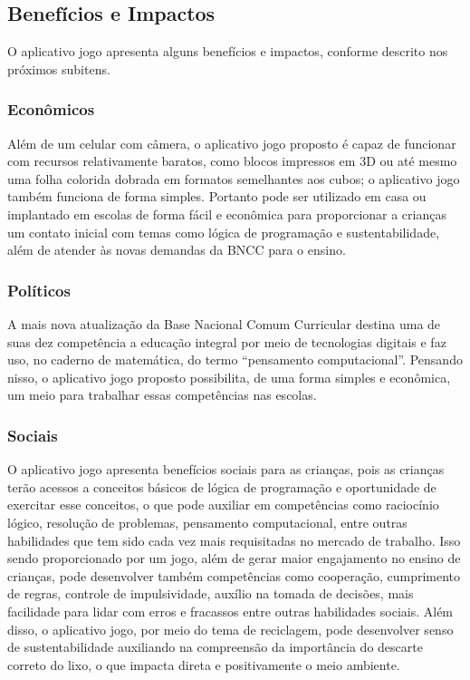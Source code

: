     \subsection{Benefícios e Impactos}
    O aplicativo jogo apresenta alguns benefícios e impactos, conforme descrito nos próximos subitens.

        \subsubsection{Econômicos}
        Além de um celular com câmera, o aplicativo jogo proposto é capaz de funcionar com recursos relativamente baratos, como blocos impressos em 3D ou até mesmo uma folha colorida dobrada em formatos semelhantes aos cubos; o aplicativo jogo também funciona de forma simples. Portanto pode ser utilizado em casa ou implantado em escolas de forma fácil e econômica para proporcionar a crianças um contato inicial com temas como lógica de programação e sustentabilidade, além de atender às novas demandas da BNCC para o ensino.
        
        
        
        \subsubsection{Políticos}
        A mais nova atualização da Base Nacional Comum Curricular destina uma de suas dez competência a educação integral por meio de tecnologias digitais e faz uso, no caderno de matemática, do termo “pensamento computacional”. Pensando nisso, o aplicativo jogo proposto possibilita, de uma forma simples e econômica, um meio para trabalhar essas competências nas escolas. 

        \subsubsection{Sociais}
        O aplicativo jogo apresenta benefícios sociais para as crianças, pois as crianças terão acessos a conceitos básicos de lógica de programação e oportunidade de exercitar esse conceitos, o que pode auxiliar em competências como raciocínio lógico, resolução de problemas, pensamento computacional, entre outras habilidades que tem sido cada vez mais requisitadas no mercado de trabalho. Isso sendo proporcionado por um jogo, além de gerar maior engajamento no ensino de crianças, pode desenvolver  também competências como cooperação, cumprimento de regras, controle de impulsividade, auxílio na tomada de decisões, mais facilidade para lidar com erros e fracassos entre outras habilidades sociais.
        Além disso, o aplicativo jogo, por meio do tema de reciclagem, pode desenvolver senso de sustentabilidade auxiliando na compreensão da importância do descarte correto do lixo, o que impacta direta e positivamente  o meio ambiente.

